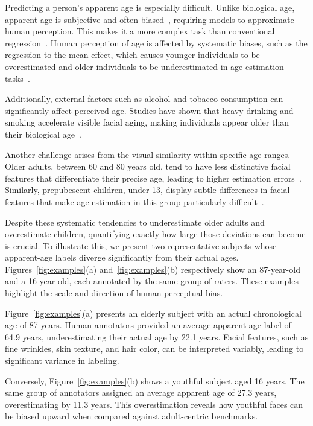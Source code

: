 \documentclass[runningheads]{llncs}
\begin{document}
Predicting a person's apparent age is especially difficult. Unlike biological age, apparent age is subjective and often biased~\cite{pilz2022contextual}, requiring models to approximate human perception. This makes it a more complex task than conventional regression~\cite{rothe2015dex}. Human perception of age is affected by systematic biases, such as the regression-to-the-mean effect, which causes younger individuals to be overestimated and older individuals to be underestimated in age estimation tasks~\cite{burt1995perception,clifford2018two}.

Additionally, external factors such as alcohol and tobacco consumption can significantly affect perceived age. Studies have shown that heavy drinking and smoking accelerate visible facial aging, making individuals appear older than their biological age~\cite{goodman2019impact}.

Another challenge arises from the visual similarity within specific age ranges. Older adults, between 60 and 80 years old, tend to have less distinctive facial features that differentiate their precise age, leading to higher estimation errors~\cite{ganel2023biases}. Similarly, prepubescent children, under 13, display subtle differences in facial features that make age estimation in this group particularly difficult~\cite{ferguson2017juvenile}.

Despite these systematic tendencies to underestimate older adults and overestimate children, quantifying exactly how large those deviations can become is crucial. To illustrate this, we present two representative subjects whose apparent-age labels diverge significantly from their actual ages. Figures~\ref{fig:examples}(a) and~\ref{fig:examples}(b) respectively show an 87-year-old and a 16-year-old, each annotated by the same group of raters. These examples highlight the scale and direction of human perceptual bias.

Figure~\ref{fig:examples}(a) presents an elderly subject with an actual chronological age of 87 years. Human annotators provided an average apparent age label of 64.9 years, underestimating their actual age by 22.1 years. Facial features, such as fine wrinkles, skin texture, and hair color, can be interpreted variably, leading to significant variance in labeling.

Conversely, Figure~\ref{fig:examples}(b) shows a youthful subject aged 16 years. The same group of annotators assigned an average apparent age of 27.3 years, overestimating by 11.3 years. This overestimation reveals how youthful faces can be biased upward when compared against adult-centric benchmarks.
\end{document}
